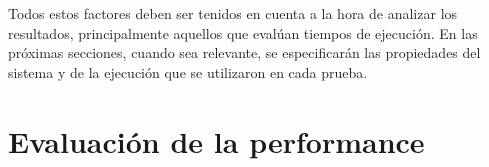 Todos estos factores deben ser tenidos en cuenta a la hora de analizar los resultados, principalmente aquellos que evalúan tiempos de ejecución. 
En las próximas secciones, cuando sea relevante, se especificarán las propiedades del sistema y de la ejecución que se utilizaron en cada prueba.
 
%  





\section{Evaluación de la performance}



